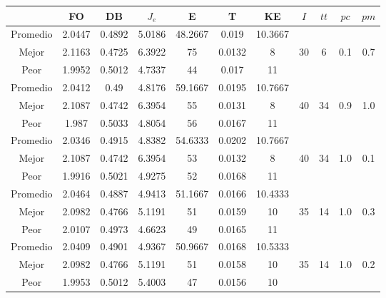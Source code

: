 \begin{table}[h!]
    \footnotesize
    \begin{center}
        \begin{tabular}{|c|c|c|c|c|c|c|c|c|c|c|}
        \hline
             & {\bf FO} & {\bf DB} & $J_e$ & {\bf E} & {\bf T} & {\bf KE} & $I$ & $tt$ & $pc$ & $pm$ \\
        \hline
        \hline
            Promedio  & 2.0447 & 0.4892 & 5.0186 & 48.2667 & 0.019 & 10.3667 &  &  &  & \\
            \cline{1-7}
            Mejor & 2.1163 & 0.4725  & 6.3922 & 75 & 0.0132 & 8 & 30 & 6 & 0.1 & 0.7\\
            \cline{1-7}
            Peor & 1.9952 & 0.5012  & 4.7337 & 44 & 0.017 & 11 &  &  &  & \\
        \hline
        \hline
            Promedio  & 2.0412 & 0.49 & 4.8176 & 59.1667 & 0.0195 & 10.7667 &  &  &  & \\
            \cline{1-7}
            Mejor & 2.1087 & 0.4742  & 6.3954 & 55 & 0.0131 & 8 & 40 & 34 & 0.9 & 1.0\\
            \cline{1-7}
            Peor & 1.987 & 0.5033  & 4.8054 & 56 & 0.0167 & 11 &  &  &  & \\
        \hline
        \hline
            Promedio  & 2.0346 & 0.4915 & 4.8382 & 54.6333 & 0.0202 & 10.7667 &  &  &  & \\
            \cline{1-7}
            Mejor & 2.1087 & 0.4742  & 6.3954 & 53 & 0.0132 & 8 & 40 & 34 & 1.0 & 0.1\\
            \cline{1-7}
            Peor & 1.9916 & 0.5021  & 4.9275 & 52 & 0.0168 & 11 &  &  &  & \\
        \hline
        \hline
            Promedio  & 2.0464 & 0.4887 & 4.9413 & 51.1667 & 0.0166 & 10.4333 &  &  &  & \\
            \cline{1-7}
            Mejor & 2.0982 & 0.4766  & 5.1191 & 51 & 0.0159 & 10 & 35 & 14 & 1.0 & 0.3\\
            \cline{1-7}
            Peor & 2.0107 & 0.4973  & 4.6623 & 49 & 0.0165 & 11 &  &  &  & \\
        \hline
        \hline
            Promedio  & 2.0409 & 0.4901 & 4.9367 & 50.9667 & 0.0168 & 10.5333 &  &  &  & \\
            \cline{1-7}
            Mejor & 2.0982 & 0.4766  & 5.1191 & 51 & 0.0158 & 10 & 35 & 14 & 1.0 & 0.2\\
            \cline{1-7}
            Peor & 1.9953 & 0.5012  & 5.4003 & 47 & 0.0156 & 10 &  &  &  & \\

\end{tabular}
\end{center}
\end{table}
